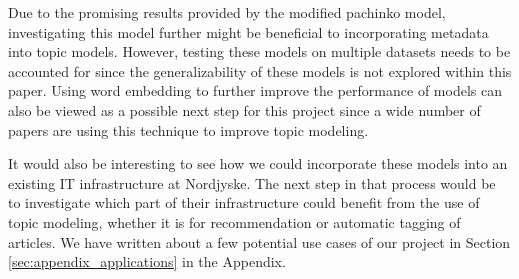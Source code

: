 Due to the promising results provided by the modified pachinko model, investigating this model further might be beneficial to incorporating metadata into topic models.
However, testing these models on multiple datasets needs to be accounted for since the generalizability of these models is not explored within this paper.
Using word embedding to further improve the performance of models can also be viewed as a possible next step for this project since a wide number of papers are using this technique to improve topic modeling\cite{MetaLDA2017}\cite{dieng2020topic}.

It would also be interesting to see how we could incorporate these models into an existing IT infrastructure at Nordjyske.
The next step in that process would be to investigate which part of their infrastructure could benefit from the use of topic modeling, whether it is for recommendation or automatic tagging of articles. 
We have written about a few potential use cases of our project in Section \ref{sec:appendix_applications} in the Appendix. 
